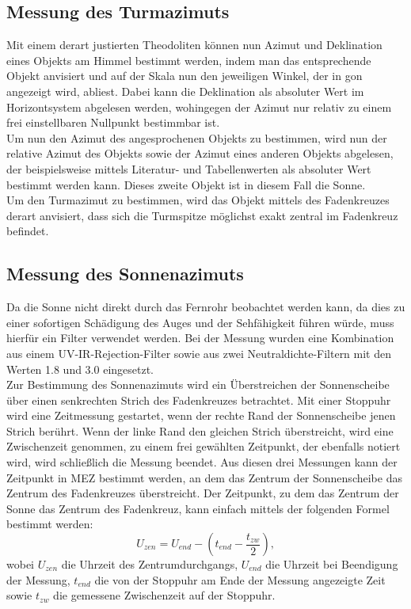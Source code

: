 \subsection{Messung des Turmazimuts}
Mit einem derart justierten Theodoliten können nun Azimut und Deklination eines Objekts am Himmel bestimmt werden, indem man das entsprechende Objekt anvisiert und auf der Skala nun den jeweiligen Winkel, der in gon angezeigt wird, abliest. Dabei kann die Deklination als absoluter Wert im Horizontsystem abgelesen werden, wohingegen der Azimut nur relativ zu einem frei einstellbaren Nullpunkt bestimmbar ist. \\
Um nun den Azimut des angesprochenen Objekts zu bestimmen, wird nun der relative Azimut des Objekts sowie der Azimut eines anderen Objekts abgelesen, der beispielsweise mittels Literatur- und Tabellenwerten als absoluter Wert bestimmt werden kann. Dieses zweite Objekt ist in diesem Fall die Sonne. \\
Um den Turmazimut zu bestimmen, wird das Objekt mittels des Fadenkreuzes derart anvisiert, dass sich die Turmspitze möglichst exakt zentral im Fadenkreuz befindet. \\

\subsection{Messung des Sonnenazimuts}
Da die Sonne nicht direkt durch das Fernrohr beobachtet werden kann, da dies zu einer sofortigen Schädigung des Auges und der Sehfähigkeit führen würde, muss hierfür ein Filter verwendet werden. Bei der Messung wurden eine Kombination aus einem UV-IR-Rejection-Filter sowie aus zwei Neutraldichte-Filtern mit den Werten 1.8 und 3.0 eingesetzt. \\ 
Zur Bestimmung des Sonnenazimuts wird ein Überstreichen der Sonnenscheibe über einen senkrechten Strich des Fadenkreuzes betrachtet. Mit einer Stoppuhr wird eine Zeitmessung gestartet, wenn der rechte Rand der Sonnenscheibe jenen Strich berührt. Wenn der linke Rand den gleichen Strich überstreicht, wird eine Zwischenzeit genommen, zu einem frei gewählten Zeitpunkt, der ebenfalls notiert wird, wird schließlich die Messung beendet. Aus diesen drei Messungen kann der Zeitpunkt in MEZ bestimmt werden, an dem das Zentrum der Sonnenscheibe das Zentrum des Fadenkreuzes überstreicht. Der Zeitpunkt, zu dem das Zentrum der Sonne das Zentrum des Fadenkreuz, kann einfach mittels der folgenden Formel bestimmt werden: 
\begin{equation}
U_{zen} = U_{end} - (t_{end} - \frac {t_{zw}}{2}), 
\end{equation}
wobei $U_{zen}$ die Uhrzeit des Zentrumdurchgangs, $U_{end}$ die Uhrzeit bei Beendigung der Messung, $t_{end}$ die von der Stoppuhr am Ende der Messung angezeigte Zeit sowie $t_{zw}$ die gemessene Zwischenzeit auf der Stoppuhr. 


